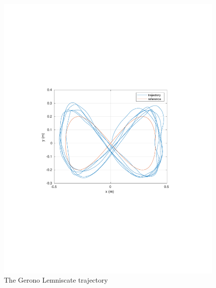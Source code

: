 \begin{frame}
 \begin{figure}[!htb]
 	\centering
 	\includegraphics[scale=.7,trim={3.5cm 8cm 4cm 8cm},clip]{figuras/CROB_Fuzzy_Gerono/ref.pdf}
 	\caption{The Gerono Lemniscate trajectory}
 	\label{fig:crob_lem}
 \end{figure}
\end{frame}
